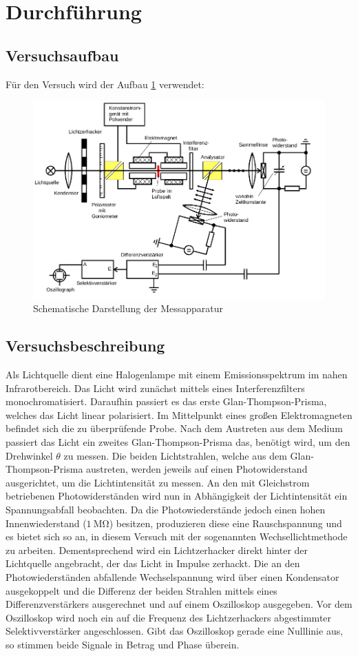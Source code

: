 \section{Durchführung}
\label{sec:Durchführung}
\subsection{Versuchsaufbau}
Für den Versuch wird der Aufbau \ref{fig:Bild2} verwendet:
\begin{figure}
	\centering
	\includegraphics[width=\textwidth]{pictures/aufbau.png}
	\caption{Schematische Darstellung der Messapparatur \cite{Anleitung}}
	\label{fig:Bild2}
\end{figure}
\subsection{Versuchsbeschreibung}
\label{sec:Versuchsbeschreibung}
Als Lichtquelle dient eine Halogenlampe mit einem Emissionsspektrum im nahen Infrarotbereich.
Das Licht wird zunächst mittels eines Interferenzfilters monochromatisiert.
Daraufhin passiert es das erste Glan-Thompson-Prisma, welches das Licht linear polarisiert.
Im Mittelpunkt eines großen Elektromagneten befindet sich die zu überprüfende Probe.
Nach dem Austreten aus dem Medium passiert das Licht ein zweites Glan-Thompson-Prisma das,
benötigt wird, um den Drehwinkel $\theta$ zu messen. Die beiden Lichtstrahlen, welche aus dem
Glan-Thompson-Prisma austreten, werden jeweils auf einen Photowiderstand ausgerichtet, um die
Lichtintensität zu messen. An den mit Gleichstrom betriebenen Photowiderständen wird nun in
Abhängigkeit der Lichtintensität ein Spannungsabfall beobachten. Da die Photowiederstände jedoch
einen hohen Innenwiederstand ($\SI{1}{\mega\ohm}$) besitzen, produzieren diese eine
Rauschspannung und es bietet sich so an, in diesem Versuch mit der sogenannten
Wechsellichtmethode zu arbeiten. Dementsprechend wird ein Lichtzerhacker direkt hinter der
Lichtquelle angebracht, der das Licht in Impulse zerhackt. Die an den Photowiederständen
abfallende Wechselspannung wird über einen Kondensator ausgekoppelt und die Differenz der
beiden Strahlen mittels eines Differenzverstärkers ausgerechnet und auf einem Oszilloskop
ausgegeben. Vor dem Oszilloskop wird noch ein auf die Frequenz des Lichtzerhackers abgestimmter
Selektivverstärker angeschlossen. Gibt das Oszilloskop gerade eine Nulllinie aus, so stimmen beide Signale in Betrag und Phase überein.
